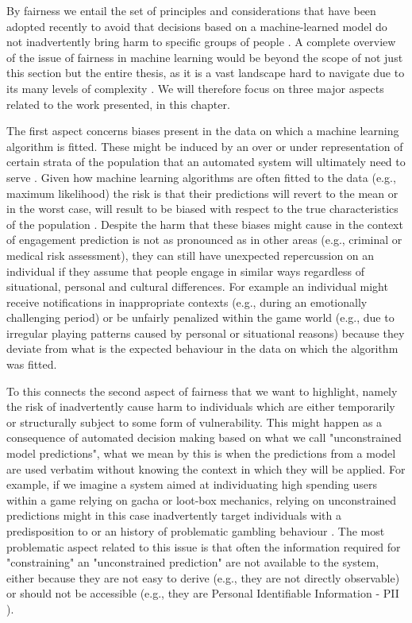 By fairness we entail the set of principles and considerations that have been adopted recently to avoid that decisions based on a machine-learned model do not inadvertently bring harm to specific groups of people \cite{mehrabi2021survey}. A complete overview of the issue of fairness in machine learning would be beyond the scope of not just this section but the entire thesis, as it is a vast landscape \cite{mehrabi2021survey} hard to navigate due to its many levels of complexity \cite{corbett2018measure}.  We will therefore focus on three major aspects related to the work presented, in this chapter. 

The first aspect concerns biases present in the data on which a machine learning algorithm is fitted. These might be induced by an over or under representation of certain strata of the population that an automated system will ultimately need to serve \cite{mehrabi2021survey}. Given how machine learning algorithms are often fitted to the data (e.g., maximum likelihood) the risk is that their predictions will revert to the mean or in the worst case, will result to be biased with respect to the true characteristics of the population \cite{corbett2018measure, mehrabi2021survey}. Despite the harm that these biases might cause in the context of engagement prediction is not as pronounced as in other areas (e.g., criminal or medical risk assessment), they can still have unexpected repercussion on an individual if they assume that people engage in similar ways regardless of situational, personal and cultural differences. For example an individual might receive notifications in inappropriate contexts (e.g.,  during an emotionally challenging period) or be unfairly penalized within the game world (e.g., due to irregular playing patterns caused by personal or situational reasons) because they deviate from what is the expected behaviour in the data on which the algorithm was fitted.

To this connects the second aspect of fairness that we want to highlight, namely the risk of inadvertently cause harm to individuals which are either temporarily or structurally subject to some form of vulnerability. This might happen as a consequence of automated decision making based on what we call "unconstrained model predictions", what we mean by this is when the predictions from a model are used verbatim without knowing the context in which they will be applied. For example, if we imagine a system aimed at individuating high spending users within a game relying on gacha or loot-box mechanics, relying on unconstrained predictions might in this case inadvertently target individuals with a predisposition to or an history of problematic gambling behaviour \cite{petrovskaya2022prevalence}. The most problematic aspect related to this issue is that often the information required for "constraining" an "unconstrained prediction" are not available to the system, either because they are not easy to derive (e.g., they are not directly observable) or should not be accessible (e.g., they are Personal Identifiable Information - PII \cite{EUdataregulations2018}).

